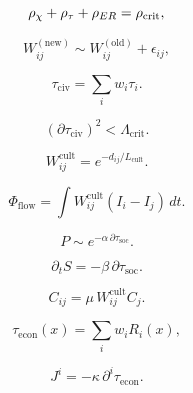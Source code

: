 \[
\rho_{\chi} + \rho_\tau + \rho_{ER}
=
\rho_{\rm crit},
\]

\[
W_{ij}^{(\text{new})} \sim W_{ij}^{(\text{old})} + \epsilon_{ij},
\]

\[
\tau_{\mathrm{civ}} = \sum_i w_i \tau_i.
\]

\[
(\partial\tau_{\mathrm{civ}})^2 < \Lambda_{\mathrm{crit}}.
\]

\[
W_{ij}^{\mathrm{cult}} = e^{-d_{ij}/L_{\mathrm{cult}}}.
\]

\[
\Phi_{\mathrm{flow}} = \int W^{\mathrm{cult}}_{ij}(I_i - I_j)\,dt.
\]

\[
P \sim e^{-\alpha\,\partial\tau_{\mathrm{soc}}}.
\]

\[
\partial_t S = -\beta\,\partial\tau_{\mathrm{soc}}.
\]

\[
C_{ij} = \mu\,W^{\mathrm{cult}}_{ij}C_j.
\]

\[
\tau_{\mathrm{econ}}(x) = \sum_i w_i R_i(x),
\]

\[
J^i = -\kappa\,\partial^i\tau_{\mathrm{econ}}.
\]

